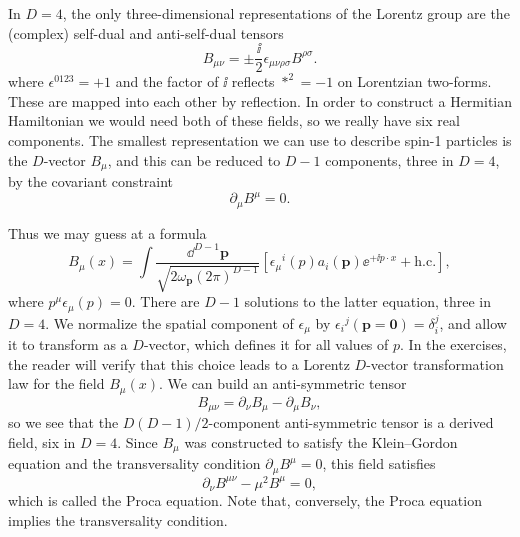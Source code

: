 In $D=4$, the only three-dimensional representations of the Lorentz group are the (complex)
self-dual and anti-self-dual tensors
\begin{equation*}
  B_{\mu\nu}=\pm\frac{\ii}{2}\epsilon_{\mu\nu\rho\sigma}B^{\rho\sigma}.
\end{equation*}
where $\epsilon^{0123}=+1$ and the factor of $\ii$ reflects $*^2=-1$ on Lorentzian
two-forms. These are mapped into each other by reflection. In order to construct a Hermitian
Hamiltonian we would need both of these fields, so we really have six real components.
The smallest representation we can use to describe spin-1 particles is the $D$-vector $B_\mu$,
and this can be reduced to $D-1$ components, three in $D=4$, by the covariant constraint
\begin{equation*}
  \partial_\mu B^\mu=0.
\end{equation*}

Thus we may guess at a formula
\begin{equation*}
  B_\mu(x)=\int\frac{\dd^{D-1}\mathbf p}
  {\sqrt{2\omega_{\mathbf p}(2\pi)^{D-1}}}
  \left[\epsilon_\mu{}^i(p)a_i(\mathbf p)\ee^{+\ii p\cdot x}
  +\mathrm{h.c.}\right],
\end{equation*}
where $p^\mu\epsilon_\mu(p)=0$.
There are $D-1$ solutions to the latter equation, three in $D=4$. We normalize the spatial component
of $\epsilon_\mu$ by $\epsilon_i{}^j(\mathbf p=\mathbf0)=\delta_i^j$, and allow it to transform as a $D$-vector, which defines it for all
values of $p$. In the exercises, the reader will verify that this choice leads to a Lorentz
$D$-vector transformation law for the field $B_\mu(x)$. We can build an anti-symmetric tensor
\begin{equation*}
  B_{\mu\nu}=\partial_\nu B_\mu-\partial_\mu B_\nu,
\end{equation*}
so we see that the $D(D-1)/2$-component anti-symmetric tensor is a derived field, six in $D=4$. Since $B_\mu$ was
constructed to satisfy the Klein--Gordon equation and the transversality condition
$\partial_\mu B^\mu=0$, this field satisfies
\begin{equation*}
  \partial_\nu B^{\mu\nu}-\mu^2B^\mu=0,
\end{equation*}
which is called the Proca \cite{banks-ref-24} equation. Note that, conversely, the Proca equation implies
the transversality condition.

